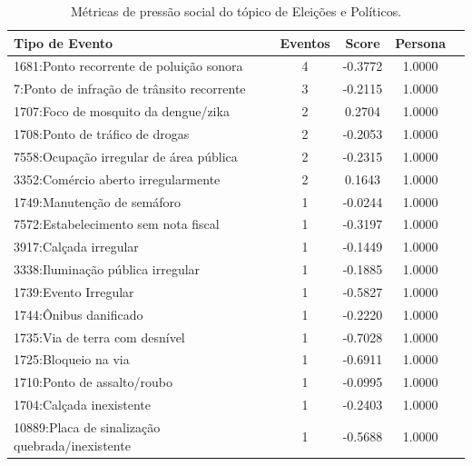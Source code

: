 \begin{table}[htbp]
	\centering
	\caption{Métricas de pressão social do tópico de Eleições e Políticos.}
	\label{tab:eventos_populares_polititians}
	\begin{tabular}{|l|c|c|c|c|}
		\hline
		\textbf{Tipo de Evento}                         & \textbf{Eventos} & \textbf{Score} & \textbf{Persona} \\
		\hline
		1681:Ponto recorrente de poluição sonora        & 4                & -0.3772        & 1.0000           \\
		\hline
		7:Ponto de infração de trânsito recorrente      & 3                & -0.2115        & 1.0000           \\
		\hline
		1707:Foco de mosquito da dengue/zika            & 2                & 0.2704         & 1.0000           \\
		\hline
		1708:Ponto de tráfico de drogas                 & 2                & -0.2053        & 1.0000           \\
		\hline
		7558:Ocupação irregular de área pública         & 2                & -0.2315        & 1.0000           \\
		\hline
		3352:Comércio aberto irregularmente             & 2                & 0.1643         & 1.0000           \\
		\hline
		1749:Manutenção de semáforo                     & 1                & -0.0244        & 1.0000           \\
		\hline
		7572:Estabelecimento sem nota fiscal            & 1                & -0.3197        & 1.0000           \\
		\hline
		3917:Calçada irregular                          & 1                & -0.1449        & 1.0000           \\
		\hline
		3338:Iluminação pública irregular               & 1                & -0.1885        & 1.0000           \\
		\hline
		1739:Evento Irregular                           & 1                & -0.5827        & 1.0000           \\
		\hline
		1744:Ônibus danificado                          & 1                & -0.2220        & 1.0000           \\
		\hline
		1735:Via de terra com desnível                  & 1                & -0.7028        & 1.0000           \\
		\hline
		1725:Bloqueio na via                            & 1                & -0.6911        & 1.0000           \\
		\hline
		1710:Ponto de assalto/roubo                     & 1                & -0.0995        & 1.0000           \\
		\hline
		1704:Calçada inexistente                        & 1                & -0.2403        & 1.0000           \\
		\hline
		10889:Placa de sinalização quebrada/inexistente & 1                & -0.5688        & 1.0000           \\
		\hline
	\end{tabular}
\end{table}

